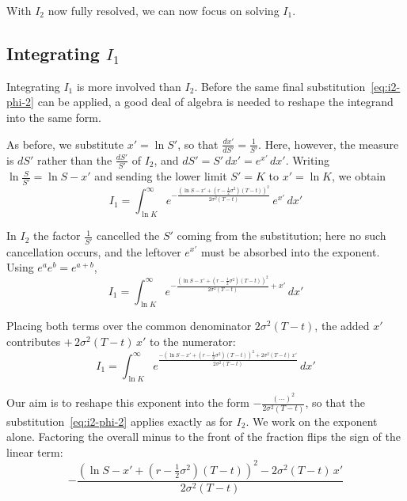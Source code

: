 \documentclass[a4paper,12pt]{article}
\numberwithin{equation}{section}
\begin{document}
With $I_2$ now fully resolved, we can now focus on solving $I_1$.

\subsection[Integrating I1]{Integrating $I_1$}

Integrating $I_1$ is more involved than $I_2$. Before the same final
substitution~\eqref{eq:i2-phi-2} can be applied, a good deal of algebra is needed
to reshape the integrand into the same form.

As before, we substitute $x' = \ln S'$, so that $\frac{dx'}{dS'} = \frac{1}{S'}$.
Here, however, the measure is $dS'$ rather than the $\frac{dS'}{S'}$ of $I_2$, and
$dS' = S'\,dx' = e^{x'}\,dx'$. Writing $\ln\frac{S}{S'} = \ln S - x'$ and sending
the lower limit $S' = K$ to $x' = \ln K$, we obtain
\begin{equation}\label{eq:i1-x}
    I_1 = \int_{\ln K}^{\infty}
    e^{-\frac{\left(\ln S - x' + \left(r - \frac{1}{2}\sigma^2\right)(T-t)\right)^2}{2\sigma^2(T-t)}}
    \,e^{x'}\,dx' 
\end{equation}

In $I_2$ the factor $\frac{1}{S'}$ cancelled the $S'$ coming from the
substitution; here no such cancellation occurs, and the leftover $e^{x'}$ must be
absorbed into the exponent. Using $e^{a}e^{b} = e^{a+b}$,
\begin{equation}\label{eq:i1-xexp}
    I_1 = \int_{\ln K}^{\infty}
    e^{-\frac{\left(\ln S - x' + \left(r - \frac{1}{2}\sigma^2\right)(T-t)\right)^2}{2\sigma^2(T-t)} + x'}
    \,dx' 
\end{equation}

Placing both terms over the common denominator $2\sigma^2(T-t)$, the added $x'$
contributes $+\,2\sigma^2(T-t)\,x'$ to the numerator:
\begin{equation}\label{eq:i1-combined}
    I_1 = \int_{\ln K}^{\infty}
    e^{\frac{-\left(\ln S - x' + \left(r - \frac{1}{2}\sigma^2\right)(T-t)\right)^2 + 2\sigma^2(T-t)\,x'}{2\sigma^2(T-t)}}
    \,dx' 
\end{equation}

Our aim is to reshape this exponent into the form $-\frac{(\cdots)^2}{2\sigma^2(T-t)}$,
so that the substitution~\eqref{eq:i2-phi-2} applies exactly as for $I_2$. We work
on the exponent alone. Factoring the overall minus to the front of the fraction
flips the sign of the linear term:
\begin{equation}\label{eq:i1-exp-1}
    -\frac{\left(\ln S - x' + \left(r - \frac{1}{2}\sigma^2\right)(T-t)\right)^2 - 2\sigma^2(T-t)\,x'}{2\sigma^2(T-t)} 
\end{equation}
\end{document}
